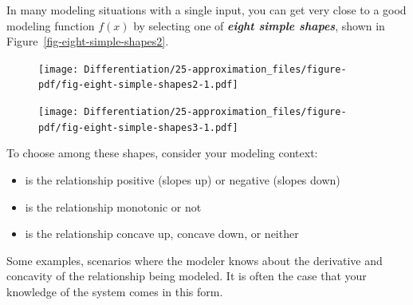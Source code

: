 \documentclass[
  letterpaper,
  DIV=11,
  numbers=noendperiod,
  oneside]{scrreprt}
\providecommand{\tightlist}{%
  \setlength{\itemsep}{0pt}\setlength{\parskip}{0pt}}
\begin{document}
In many modeling situations with a single input, you can get very close
to a good modeling function \(f(x)\) by selecting one of
\textbf{\emph{eight simple shapes}}, shown in
Figure~\ref{fig-eight-simple-shapes2}.

\begin{figure}


{\centering \texttt{[image: Differentiation/25-approximation\_files/figure-pdf/fig-eight-simple-shapes2-1.pdf]}

}

\end{figure}

\begin{figure}


{\centering \texttt{[image: Differentiation/25-approximation\_files/figure-pdf/fig-eight-simple-shapes3-1.pdf]}

}

\end{figure}

To choose among these shapes, consider your modeling context:

\begin{itemize}
\tightlist
\item
  is the relationship positive (slopes up) or negative (slopes down)
\item
  is the relationship monotonic or not
\item
  is the relationship concave up, concave down, or neither
\end{itemize}

Some examples, scenarios where the modeler knows about the derivative
and concavity of the relationship being modeled. It is often the case
that your knowledge of the system comes in this form.
\end{document}
